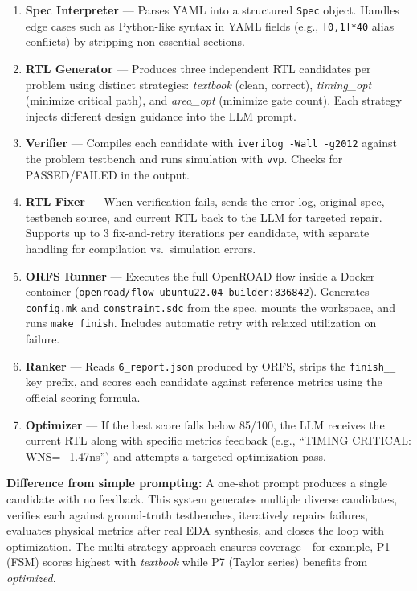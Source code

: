 \documentclass[10pt]{article}
\begin{document}
\begin{enumerate}[leftmargin=*,topsep=2pt,itemsep=1pt]
  \item \textbf{Spec Interpreter} --- Parses YAML into a structured \texttt{Spec} object. Handles edge cases such as Python-like syntax in YAML fields (e.g., \texttt{[0,1]*40} alias conflicts) by stripping non-essential sections.
  \item \textbf{RTL Generator} --- Produces three independent RTL candidates per problem using distinct strategies: \emph{textbook} (clean, correct), \emph{timing\_opt} (minimize critical path), and \emph{area\_opt} (minimize gate count). Each strategy injects different design guidance into the LLM prompt.
  \item \textbf{Verifier} --- Compiles each candidate with \texttt{iverilog -Wall -g2012} against the problem testbench and runs simulation with \texttt{vvp}. Checks for PASSED/FAILED in the output.
  \item \textbf{RTL Fixer} --- When verification fails, sends the error log, original spec, testbench source, and current RTL back to the LLM for targeted repair. Supports up to 3 fix-and-retry iterations per candidate, with separate handling for compilation vs.\ simulation errors.
  \item \textbf{ORFS Runner} --- Executes the full OpenROAD flow inside a Docker container (\texttt{openroad/flow-ubuntu22.04-builder:836842}). Generates \texttt{config.mk} and \texttt{constraint.sdc} from the spec, mounts the workspace, and runs \texttt{make finish}. Includes automatic retry with relaxed utilization on failure.
  \item \textbf{Ranker} --- Reads \texttt{6\_report.json} produced by ORFS, strips the \texttt{finish\_\_} key prefix, and scores each candidate against reference metrics using the official scoring formula.
  \item \textbf{Optimizer} --- If the best score falls below 85/100, the LLM receives the current RTL along with specific metrics feedback (e.g., ``TIMING CRITICAL: WNS=$-$1.47ns'') and attempts a targeted optimization pass.
\end{enumerate}

\textbf{Difference from simple prompting:} A one-shot prompt produces a single candidate with no feedback. This system generates multiple diverse candidates, verifies each against ground-truth testbenches, iteratively repairs failures, evaluates physical metrics after real EDA synthesis, and closes the loop with optimization. The multi-strategy approach ensures coverage---for example, P1 (FSM) scores highest with \emph{textbook} while P7 (Taylor series) benefits from \emph{optimized}.
\end{document}
